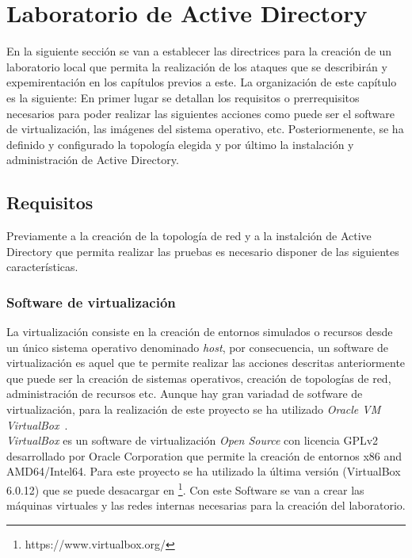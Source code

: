 \section{Laboratorio de Active Directory}

En la siguiente sección se van a establecer las directrices para la creación de un laboratorio local que permita la realización de los ataques que se describirán y expemirentación en los capítulos previos a este. La organización de este capítulo es la siguiente: En primer lugar se detallan los requisitos o prerrequisitos necesarios para poder realizar las siguientes acciones como puede ser el software de virtualización, las imágenes del sistema operativo, etc. Posteriormenente, se ha definido y configurado la topología elegida y por último la instalación y administración de Active Directory. 

\subsection{Requisitos}

Previamente a la creación de la topología de red y a la instalción de  Active Directory que permita realizar las pruebas es necesario disponer de las siguientes características.

\subsubsection{Software de virtualización}

La virtualización consiste en la creación de entornos simulados o recursos desde un único sistema operativo denominado {\it host}, por consecuencia, un software de virtualización es aquel que te permite realizar las acciones descritas anteriormente que puede ser la creación de sistemas operativos, creación de topologías de red, administración de recursos etc. Aunque hay gran variadad de sotfware de virtualización, para la realización de este proyecto se ha utilizado {\it Oracle VM VirtualBox}~\cite{Capitulo4:VirtualBox}.\\

{\it VirtualBox} es un software de virtualización {\it Open Source} con licencia GPLv2 desarrollado por Oracle Corporation que permite la creación de entornos x86 and AMD64/Intel64. Para este proyecto se ha utilizado la última versión (VirtualBox 6.0.12) que se puede desacargar en \footnote{https://www.virtualbox.org/}. Con este Software se van a crear las máquinas virtuales y las redes internas necesarias para la creación del laboratorio. 


